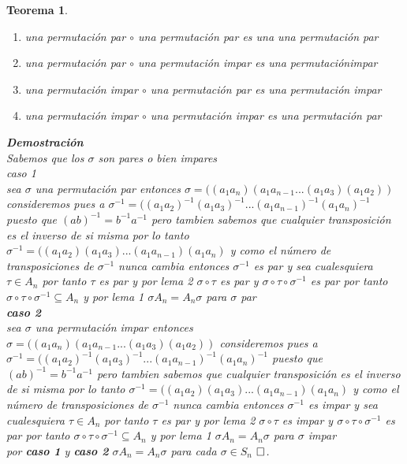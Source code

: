 \documentclass{article}
\newcounter{Teorema}
\numberwithin{equation}{section}
\theoremstyle{plain}  %
\newtheorem{thm}{Teorema}[section]
\begin{document}
\begin{thm}


\begin{enumerate}
    \item una permutación par $\circ $ una permutación par es una una permutación par
    \item una permutación par $\circ $  una permutación impar es una permutaciónimpar
    \item una permutación impar $\circ $ una permutación par es una permutación impar
    \item una permutación impar $\circ $ una permutación impar es una permutación par
    
\end{enumerate}


\textbf{Demostración}\\
Sabemos que los $\sigma$ son pares o bien impares\\
\newline
\textit{caso 1} \\ sea $\sigma$ una permutación par entonces $\sigma =( (a_{1}a_{n})(a_{1}a_{n-1} ...(a_{1}a_{3})(a_{1}a_{2}) )$ consideremos pues a $\sigma^{-1} = ((a_{1}a_{2})^{-1}(a_{1}a_{3})^{-1}...(a_{1}a_{n-1})^{-1}(a_{1}a_{n})^{-1}$ puesto que $(ab)^{-1}= b^{-1}a^{-1}$ pero tambien sabemos que cualquier transposición es el inverso de si misma por lo tanto $\sigma^{-1} = ((a_{1}a_{2})(a_{1}a_{3})...(a_{1}a_{n-1})(a_{1}a_{n})$ y como el número de transposiciones de $\sigma^{-1}$ nunca cambia entonces $\sigma^{-1}$ es par y sea cualesquiera $\tau \in A_{n}$ por tanto $\tau$ es par y por lema 2 $\sigma \circ \tau$ es par y $\sigma \circ \tau \circ \sigma^{-1}$ es par por tanto $\sigma \circ \tau \circ \sigma^{-1}\subseteq A_{n}$ y por lema 1 $\sigma A_{n} = A_{n} \sigma$ para $\sigma$ par\\
\newline
\textbf{caso 2} \\
sea $\sigma$ una permutación impar entonces $\sigma =( (a_{1}a_{n})(a_{1}a_{n-1} ...(a_{1}a_{3})(a_{1}a_{2}) )$ consideremos pues a $\sigma^{-1} = ((a_{1}a_{2})^{-1}(a_{1}a_{3})^{-1}...(a_{1}a_{n-1})^{-1}(a_{1}a_{n})^{-1}$ puesto que $(ab)^{-1}= b^{-1}a^{-1}$ pero tambien sabemos que cualquier transposición es el inverso de si misma por lo tanto $\sigma^{-1} = ((a_{1}a_{2})(a_{1}a_{3})...(a_{1}a_{n-1})(a_{1}a_{n})$ y como el número de transposiciones de $\sigma^{-1}$ nunca cambia entonces $\sigma^{-1}$ es impar y sea cualesquiera $\tau \in A_{n}$ por tanto $\tau$ es par y por lema 2 $\sigma \circ \tau$ es impar y $\sigma \circ \tau \circ \sigma^{-1}$ es par por tanto $\sigma \circ \tau \circ \sigma^{-1}\subseteq A_{n}$ y por lema 1 $\sigma A_{n} = A_{n} \sigma$ para $\sigma$ impar\\
\newline
por \textbf{caso 1} y \textbf{caso 2} $\sigma A_{n} = A_{n} \sigma$ para cada $\sigma \in S_{n}$ $\hfill\square$.
\end{thm}
\end{document}
